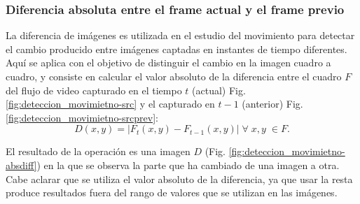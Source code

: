 \subsubsection{Diferencia absoluta entre el frame actual y el frame previo}
La diferencia de imágenes es utilizada en el estudio del movimiento para detectar el cambio producido entre imágenes captadas en instantes de tiempo diferentes. Aquí se aplica con el objetivo de distinguir el cambio en la imagen cuadro a cuadro, y consiste en calcular el valor absoluto de la diferencia entre el cuadro $F$ del flujo de video capturado en el tiempo $t$ (actual) Fig. \ref{fig:deteccion_movimietno-src} y el capturado en $t-1$ (anterior) Fig. \ref{fig:deteccion_movimietno-srcprev}:
\begin{equation}
D(x,y)=|F_{t}(x,y)-F_{t-1}(x,y)|\;\forall\; x,y\;\in F.
\label{eq:diferencia_absoluta}
\end{equation}

El resultado de la operación es una imagen $D$ (Fig. \ref{fig:deteccion_movimietno-absdiff}) en la que se observa la parte que ha cambiado de una imagen a otra. Cabe aclarar que se utiliza el valor absoluto de la diferencia, ya que usar la resta produce resultados fuera del rango de valores que se utilizan en las imágenes. %

